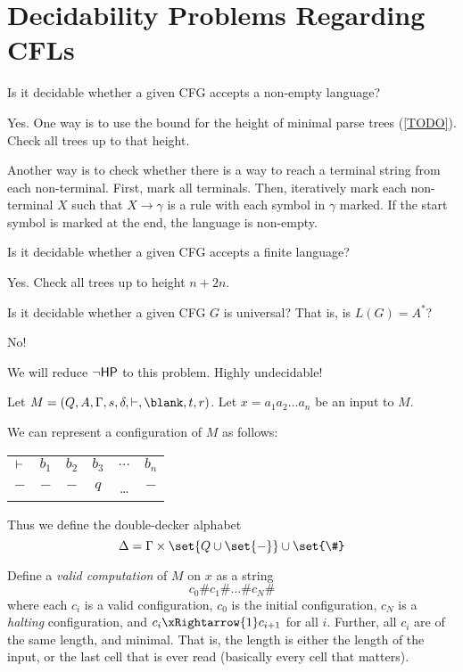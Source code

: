 \section{Decidability Problems Regarding CFLs} \label{sec:cfl:decidability}
\begin{exercise}
    Is it decidable whether a given CFG accepts a non-empty language?
\end{exercise}
\begin{solution}
    Yes.
    One way is to use the bound for the height of minimal parse trees
    (\cref{TODO}).
    Check all trees up to that height.

    Another way is to check whether there is a way to reach a terminal
    string from each non-terminal.
    First, mark all terminals.
    Then, iteratively mark each non-terminal $X$ such that $X \to \gamma$
    is a rule with each symbol in $\gamma$ marked.
    If the start symbol is marked at the end,
    the language is non-empty.
\end{solution}

\begin{exercise}
    Is it decidable whether a given CFG accepts a finite language?
\end{exercise}
\begin{solution}
    Yes.
    Check all trees up to height $n + 2n$. %
\end{solution}

\begin{exercise}
    Is it decidable whether a given CFG $G$ is universal?
    That is, is $L(G) = A^*$?
\end{exercise}
\begin{solution}
    No!

    We will reduce $\neg\mathsf{HP}$ to this problem.
    Highly undecidable!

    Let $M = (Q, A, \Gamma, s, \delta, \leftend, \blank, t, r)$.
    Let $x = a_1 a_2 \dots a_n$ be an input to $M$.

    We can represent a configuration of $M$ as follows:
    \begin{center}
        \begin{tabular}{cccccc}
            ${\vdash}$ & $b_1$ & $b_2$ & $b_3$ & $\dots$ & $b_n$ \\
            $-$ & $-$ & $-$ & $q$ & \dots & $-$
        \end{tabular}
    \end{center}
    Thus we define the double-decker alphabet \[
        \Delta = \Gamma \times \set{Q \cup \set{-}}
                \cup \set{\#}
    \]

    Define a \emph{valid computation} of $M$ on $x$ as a string \[
        c_0 \# c_1 \# \dots \# c_N \#
    \] where each $c_i$ is a valid configuration,
    $c_0$ is the initial configuration,
    $c_N$ is a \emph{halting} configuration,
    and $c_i \xRightarrow{1} c_{i+1}$ for all $i$.
    Further, all $c_i$ are of the same length, and minimal.
    That is, the length is either the length of the input,
    or the last cell that is ever read
    (basically every cell that matters).
\end{solution}
